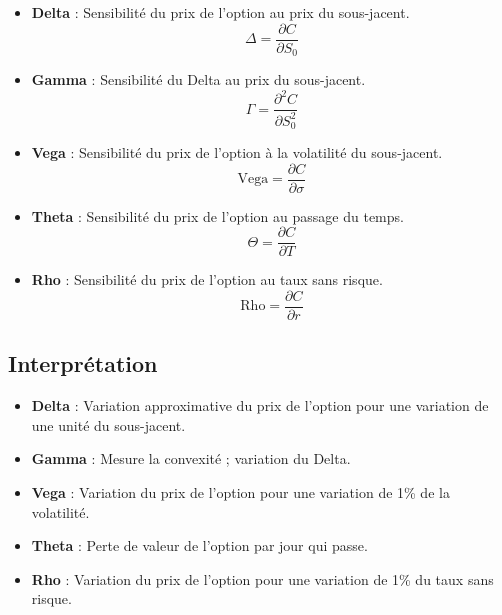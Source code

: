 \documentclass{article}
\begin{document}
\begin{itemize}
    \item \textbf{Delta} : Sensibilité du prix de l'option au prix du sous-jacent.
    \[
    \Delta = \frac{\partial C}{\partial S_0}
    \]

    \item \textbf{Gamma} : Sensibilité du Delta au prix du sous-jacent.
    \[
    \Gamma = \frac{\partial^2 C}{\partial S_0^2}
    \]

    \item \textbf{Vega} : Sensibilité du prix de l'option à la volatilité du sous-jacent.
    \[
    \text{Vega} = \frac{\partial C}{\partial \sigma}
    \]

    \item \textbf{Theta} : Sensibilité du prix de l'option au passage du temps.
    \[
    \Theta = \frac{\partial C}{\partial T}
    \]

    \item \textbf{Rho} : Sensibilité du prix de l'option au taux sans risque.
    \[
    \text{Rho} = \frac{\partial C}{\partial r}
    \]
\end{itemize}

\subsection{Interprétation}

\begin{itemize}
    \item \textbf{Delta} : Variation approximative du prix de l'option pour une variation de une unité du sous-jacent.
    \item \textbf{Gamma} : Mesure la convexité ; variation du Delta.
    \item \textbf{Vega} : Variation du prix de l'option pour une variation de 1\% de la volatilité.
    \item \textbf{Theta} : Perte de valeur de l'option par jour qui passe.
    \item \textbf{Rho} : Variation du prix de l'option pour une variation de 1\% du taux sans risque.
\end{itemize}
\end{document}
